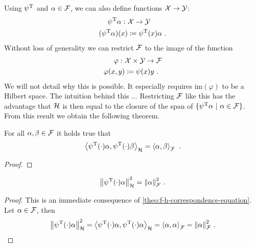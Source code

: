 Using $\psi^{\mathrm{T}}$ and $\alpha \in \mathcal{F}$, we can also define functions $\mathcal{X} \rightarrow \mathcal{Y}$:
\begin{align}
		\psi^{\mathrm{T}}\alpha: ~&\mathcal{X} \rightarrow \mathcal{Y} \\
		(\psi^{\mathrm{T}}\alpha)(x) &\coloneqq \psi^{\mathrm{T}}(x)\alpha \ .
\end{align}
Without loss of generality we can restrict $\mathcal{F}$ to the image of the function
\begin{align}
	\varphi: ~&\mathcal{X} \times \mathcal{Y} \rightarrow \mathcal{F}\\
	\varphi(x, y) &\coloneqq \psi(x)y\ .
\end{align}
We will not detail why this is possible.
It especially requires $\mathrm{im}(\varphi)$ to be a Hilbert space.
The intuition behind this ...
Restricting $\mathcal{F}$ like this has the advantage that $\mathcal{H}$ is then equal to the closure of the span of $\{\psi^{\mathrm{T}}\alpha\ |\ \alpha \in \mathcal{F}\}$.
From this result we obtain the following theorem.
\begin{theorem}
	\label{theo:f-h-correspondence-equation}
	For all $\alpha, \beta \in \mathcal{F}$ it holds true that
	\begin{equation}
		\left< \psi^{\mathrm{T}}(\cdot) \alpha, \psi^{\mathrm{T}}(\cdot) \beta\right>_{\mathcal{H}} = \left< \alpha, \beta\right>_{\mathcal{F}} \ .
	\end{equation}
\end{theorem}
\begin{proof}
	
\end{proof}
\begin{corollary}
	\label{cor:feature-space-norm}
	\begin{equation}
		\norm{\psi^{\mathrm{T}}(\cdot)\alpha}_{\mathcal{H}}^2 = \norm{\alpha}_{\mathcal{F}}^2 \ .
	\end{equation}
\end{corollary}
\begin{proof}
	This is an immediate consequence of \cref{theo:f-h-correspondence-equation}.
	Let $\alpha \in \mathcal{F}$, then
	\begin{equation}
		\norm{\psi^{\mathrm{T}}(\cdot)\alpha}_{\mathcal{H}}^2 = \left< \psi^{\mathrm{T}}(\cdot)\alpha, \psi^{\mathrm{T}}(\cdot)\alpha \right>_{\mathcal{H}}
		= \left< \alpha, \alpha \right>_{\mathcal{F}} = \norm{\alpha}_{\mathcal{F}}^2 \ .
	\end{equation}
\end{proof}
